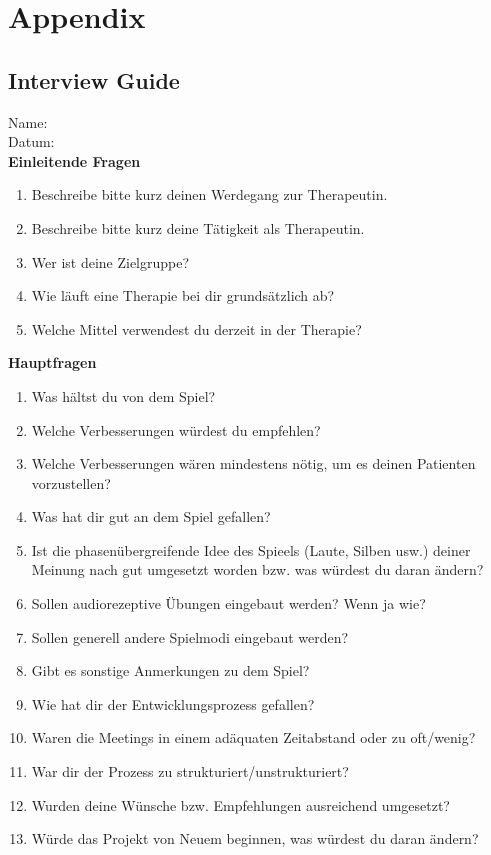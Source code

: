 \documentclass[draft,final]{vutinfth} %
\begin{document}




\chapter{Appendix}
\section{Interview Guide}
Name:\\
Datum: \\

\textbf{Einleitende Fragen}
\begin{enumerate}
\item Beschreibe bitte kurz deinen Werdegang zur Therapeutin.
\item Beschreibe bitte kurz deine Tätigkeit als Therapeutin.
\item Wer ist deine Zielgruppe?
\item Wie läuft eine Therapie bei dir grundsätzlich ab?
\item Welche Mittel verwendest du derzeit in der Therapie?
\end{enumerate}

\textbf{Hauptfragen}
\begin{enumerate}
\item Was hältst du von dem Spiel?
\item Welche Verbesserungen würdest du empfehlen?
\item Welche Verbesserungen wären mindestens nötig, um es deinen Patienten vorzustellen?
\item Was hat dir gut an dem Spiel gefallen?
\item Ist die phasenübergreifende Idee des Spieels (Laute, Silben usw.) deiner Meinung nach gut umgesetzt worden bzw. was würdest du daran ändern?
\item Sollen audiorezeptive Übungen eingebaut werden? Wenn ja wie?
\item Sollen generell andere Spielmodi eingebaut werden?
\item Gibt es sonstige Anmerkungen zu dem Spiel?
\item Wie hat dir der Entwicklungsprozess gefallen?
\item Waren die Meetings in einem adäquaten Zeitabstand oder zu oft/wenig?
\item War dir der Prozess zu strukturiert/unstrukturiert?
\item Wurden deine Wünsche bzw. Empfehlungen ausreichend umgesetzt?
\item Würde das Projekt von Neuem beginnen, was würdest du daran ändern?
\end{enumerate}
\end{document}
